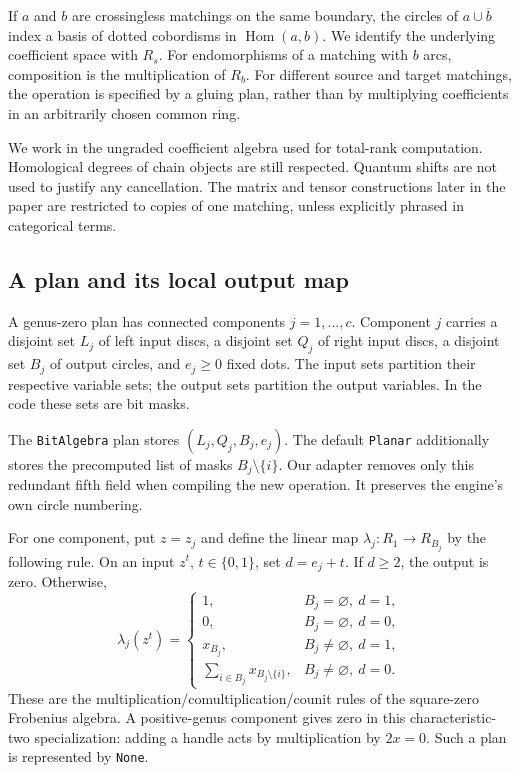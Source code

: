 \documentclass[11pt]{article}
\theoremstyle{definition}\newtheorem{definition}[theorem]{Definition}
\theoremstyle{remark}\newtheorem{remark}[theorem]{Remark}
\newcommand{\Hom}{\operatorname{Hom}}
\newcommand{\code}[1]{\texttt{#1}}
\begin{document}
If $a$ and $b$ are crossingless matchings on the same boundary, the circles of $a\cup\overline b$ index a basis of dotted cobordisms in $\Hom(a,b)$. We identify the underlying coefficient space with $R_s$. For endomorphisms of a matching with $b$ arcs, composition is the multiplication of $R_b$. For different source and target matchings, the operation is specified by a gluing plan, rather than by multiplying coefficients in an arbitrarily chosen common ring.

We work in the ungraded coefficient algebra used for total-rank computation. Homological degrees of chain objects are still respected. Quantum shifts are not used to justify any cancellation. The matrix and tensor constructions later in the paper are restricted to copies of one matching, unless explicitly phrased in categorical terms.

\subsection{A plan and its local output map}
A genus-zero plan has connected components $j=1,\ldots,c$. Component $j$ carries a disjoint set $L_j$ of left input discs, a disjoint set $Q_j$ of right input discs, a disjoint set $B_j$ of output circles, and $e_j\geq0$ fixed dots. The input sets partition their respective variable sets; the output sets partition the output variables. In the code these sets are bit masks.

The \code{BitAlgebra} plan stores $(L_j,Q_j,B_j,e_j)$. The default \code{Planar} additionally stores the precomputed list of masks $B_j\setminus\{i\}$. Our adapter removes only this redundant fifth field when compiling the new operation. It preserves the engine's own circle numbering.

For one component, put $z=z_j$ and define the linear map $\lambda_j:R_1\to R_{B_j}$ by the following rule. On an input $z^t$, $t\in\{0,1\}$, set $d=e_j+t$. If $d\geq2$, the output is zero. Otherwise,
\begin{equation}\label{eq:lambda}
 \lambda_j(z^t)=
 \begin{cases}
  1,& B_j=\varnothing,\ d=1,\\
  0,& B_j=\varnothing,\ d=0,\\
  x_{B_j},& B_j\ne\varnothing,\ d=1,\\
  \displaystyle\sum_{i\in B_j}x_{B_j\setminus\{i\}},
       &B_j\ne\varnothing,\ d=0.
 \end{cases}
\end{equation}
These are the multiplication/comultiplication/counit rules of the square-zero Frobenius algebra. A positive-genus component gives zero in this characteristic-two specialization: adding a handle acts by multiplication by $2x=0$. Such a plan is represented by \code{None}.
\end{document}

